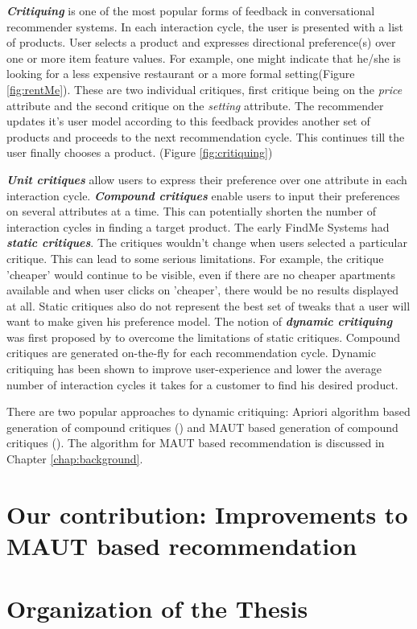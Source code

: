 \textit{\textbf{Critiquing}} is one of the most popular forms of feedback in conversational recommender systems. In each interaction cycle, the user is presented with a list of products.
User selects a product and expresses directional preference(s) over one or more item feature values. 
For example, one might indicate that he/she is looking for a less expensive restaurant or a more formal setting(Figure \ref{fig:rentMe}). These are two individual critiques, first critique being on the \textit{price} attribute and the second critique on the \textit{setting} attribute. 
The recommender updates it's user model according to this feedback provides another set of products and proceeds to the next recommendation cycle. This continues till the user finally chooses a product. (Figure \ref{fig:critiquing})

\textit{\textbf{Unit critiques}} allow users to express their preference over one attribute in each interaction cycle. \textit{\textbf{Compound critiques}} enable users to input their preferences on several attributes at a time. This can potentially shorten the number of interaction cycles in finding a target product.
The early FindMe Systems \cite{burkeEarlierSystems} had \textit{\textbf{static critiques}}. The critiques wouldn't change when users selected a particular critique. 
This can lead to some serious limitations.
For example, the critique 'cheaper' would continue to be visible, even if there are no cheaper apartments available and when user clicks on 'cheaper', there would be no results displayed at all.
Static critiques also do not represent the best set of tweaks that a user will want to make given his preference model.
The notion of \textit{\textbf{dynamic critiquing}} was first proposed by \cite{mccarthy2004dynamic} to overcome the limitations of static critiques.
Compound critiques are generated on-the-fly for each recommendation cycle. Dynamic critiquing has been shown to improve user-experience and lower the average number of interaction cycles it takes for a customer to find his desired product.

There are two popular approaches to dynamic critiquing: Apriori algorithm based generation of compound critiques (\cite{mccarthy2004dynamic}) and MAUT based generation of compound critiques (\cite{mautPaper}). 
The algorithm for MAUT based recommendation is discussed in Chapter \ref{chap:background}.


\section{Our contribution: Improvements to MAUT based recommendation}
\section{Organization of the Thesis}
